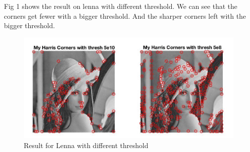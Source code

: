 \documentclass{article}
\begin{document}
Fig 1 shows the result on lenna with different threshold. We can see that the corners get fewer with a bigger threshold. And the sharper corners left with the bigger threshold.

\begin{figure}[htbp]
    \centering
    \includegraphics[scale = 0.25]{fig1.jpg}
    \caption{Result for Lenna with different threshold}
    \label{fig1}
\end{figure}
\end{document}
